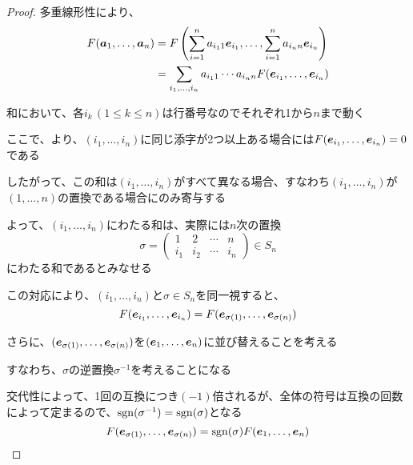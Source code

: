\documentclass[../../../topic_linear-algebra]{subfiles}
\begin{document}
\begin{proof}
  多重線形性により、
  \begin{align*}
    F(\vb*{a}_1, \ldots, \vb*{a}_n) & = F \left( \sum_{i=1}^n a_{i_1 1} \vb*{e}_{i_1}, \ldots, \sum_{i=1}^n a_{i_n n} \vb*{e}_{i_n} \right) \\
                                    & = \sum_{i_1, \ldots, i_n} a_{i_1 1} \cdots a_{i_n n} F(\vb*{e}_{i_1}, \ldots, \vb*{e}_{i_n})
  \end{align*}

  和において、各$i_k \, (1 \leq k \leq n)$は行番号なのでそれぞれ1から$n$まで動く

  \br

  ここで、より、$(i_1, \ldots, i_n)$に同じ添字が2つ以上ある場合には$F(\vb*{e}_{i_1}, \ldots, \vb*{e}_{i_n}) = 0$である

  したがって、この和は$(i_1, \ldots, i_n)$がすべて異なる場合、すなわち$(i_1, \ldots, i_n)$が$(1, \ldots, n)$の置換である場合にのみ寄与する

  \br

  よって、$(i_1, \ldots, i_n)$にわたる和は、実際には$n$次の置換
  \begin{equation*}
    \sigma = \begin{pmatrix}
      1   & 2   & \cdots & n   \\
      i_1 & i_2 & \cdots & i_n
    \end{pmatrix} \in S_n
  \end{equation*}
  にわたる和であるとみなせる

  \br

  この対応により、$(i_1, \ldots, i_n)$と$\sigma \in S_n$を同一視すると、
  \begin{equation*}
    F(\vb*{e}_{i_1}, \ldots, \vb*{e}_{i_n}) = F(\vb*{e}_{\sigma(1)}, \ldots, \vb*{e}_{\sigma(n)})
  \end{equation*}

  さらに、$(\vb*{e}_{\sigma(1)}, \ldots, \vb*{e}_{\sigma(n)})$を$(\vb*{e}_1, \ldots, \vb*{e}_n)$に並び替えることを考える

  すなわち、$\sigma$の逆置換$\sigma^{-1}$を考えることになる

  交代性によって、1回の互換につき$(-1)$倍されるが、全体の符号は互換の回数によって定まるので、$\operatorname{sgn}(\sigma^{-1}) = \operatorname{sgn}(\sigma)$となる
  \begin{equation*}
    F(\vb*{e}_{\sigma(1)}, \ldots, \vb*{e}_{\sigma(n)}) = \operatorname{sgn}(\sigma) F(\vb*{e}_1, \ldots, \vb*{e}_n)
  \end{equation*}


\end{proof}
\end{document}
